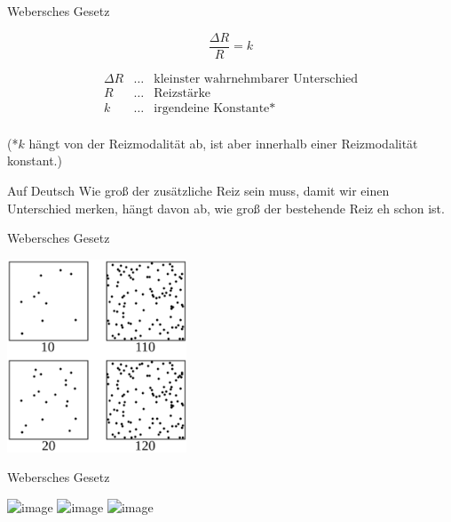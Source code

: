 \documentclass[aspectratio=169]{beamer}
\begin{document}
\begin{frame}{Webersches Gesetz}

\[
\frac{\Delta R}{R} = k
\]

\[
\begin{array}{lll}
\Delta R    & \ldots    & \text{kleinster wahrnehmbarer Unterschied} \\
R           & \ldots    & \text{Reizstärke} \\
k           & \ldots    & \text{irgendeine Konstante*} \\
\end{array}
\]


(*\(k\) hängt von der Reizmodalität ab, ist aber innerhalb einer Reizmodalität konstant.)



\begin{block}{Auf Deutsch}
Wie groß der zusätzliche Reiz sein muss, damit wir einen Unterschied merken, hängt davon ab, wie groß der bestehende Reiz eh schon ist. 
\end{block}



\end{frame}


\begin{frame}{Webersches Gesetz}
\begin{center}
    \includegraphics[width=0.4\textwidth]{Weber-Fechner_law_demo_-_dots.svg.png}
\end{center}
\end{frame}


\begin{frame}{Webersches Gesetz}

\begin{center}
    \includegraphics<1>[width=0.6\textwidth]{weber_fechner_1.png}
    \includegraphics<2>[width=0.6\textwidth]{weber_fechner_2.png}
    \includegraphics<3>[width=0.6\textwidth]{weber_fechner_3.png}
\end{center}
    
\end{frame}
\end{document}
